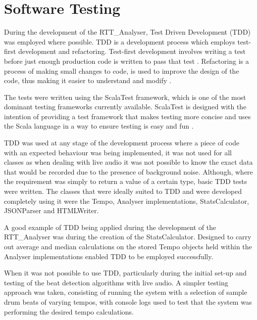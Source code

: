 \documentclass[a4paper, 11pt]{article}
\begin{document}
\maketitle{}\section{Software Testing}
During the development of the RTT\_Analyser, Test Driven Development (TDD) was employed where possible. TDD is a development process which employs test-first development and refactoring. Test-first development involves writing a test before just enough production code is written to pass that test \cite{tdd1}. Refactoring is a process of making small changes to code, is used to improve the design of the code, thus making it easier to understand and modify \cite{tdd2}. \par

The tests were written using the ScalaTest framework, which is one of the most dominant testing frameworks currently available. ScalaTest is designed with the intention of providing a test framework that makes testing more concise and uses the Scala language in a way to ensure testing is easy and fun \cite{testingScala}.

TDD was used at any stage of the development process where a piece of code with an expected behaviour was being implemented, it was not used for all classes as when dealing with live audio it was not possible to know the exact data that would be recorded due to the presence of background noise. Although, where the requirement was simply to return a value of a certain type, basic TDD tests were written. The classes that were ideally suited to TDD and were developed completely using it were the Tempo, Analyser implementations, StatsCalculator, JSONParser and HTMLWriter. \par

A good example of TDD being applied during the development of the RTT\_Analyser was during the creation of the StatsCalculator. Designed to carry out average and median calculations on the stored Tempo objects held within the Analyser implementations enabled TDD to be employed successfully.

When it was not possible to use TDD, particularly during the initial set-up and testing of the beat detection algorithms with live audio. A simpler testing approach was taken, consisting of running the system with a selection of sample drum beats of varying tempos, with console logs used to test that the system was performing the desired tempo calculations.
\end{document}
